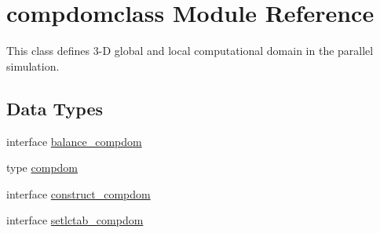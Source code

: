 \hypertarget{namespacecompdomclass}{}\section{compdomclass Module Reference}
\label{namespacecompdomclass}


This class defines 3-\/D global and local computational domain in the parallel simulation.  


\subsection*{Data Types}
\begin{DoxyCompactItemize}
\item 
interface \mbox{\hyperlink{interfacecompdomclass_1_1balance__compdom}{balance\+\_\+compdom}}
\item 
type \mbox{\hyperlink{namespacecompdomclass_structcompdomclass_1_1compdom}{compdom}}
\item 
interface \mbox{\hyperlink{interfacecompdomclass_1_1construct__compdom}{construct\+\_\+compdom}}
\item 
interface \mbox{\hyperlink{interfacecompdomclass_1_1setlctab__compdom}{setlctab\+\_\+compdom}}
\end{DoxyCompactItemize}
